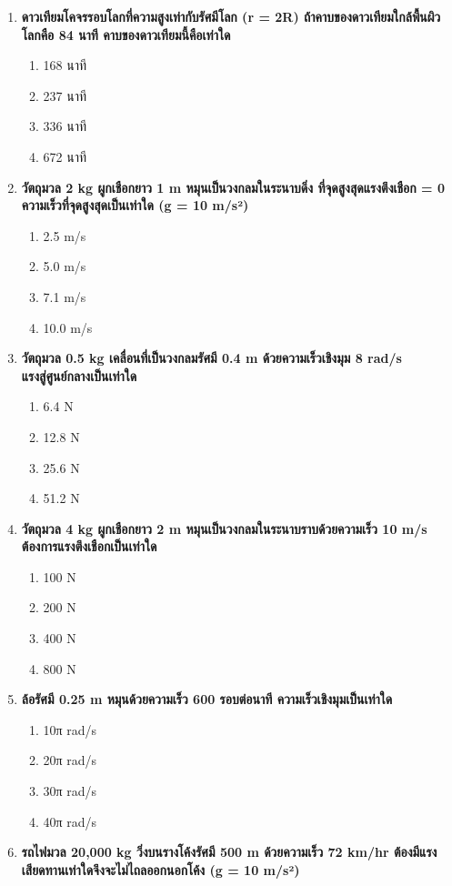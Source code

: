 \documentclass[12pt]{article}
\begin{document}
\begin{enumerate}
\begin{enumerate}[label=\alph*)]
\end{enumerate}
\item \textbf{ดาวเทียมโคจรรอบโลกที่ความสูงเท่ากับรัศมีโลก (r = 2R) ถ้าคาบของดาวเทียมใกล้พื้นผิวโลกคือ 84 นาที คาบของดาวเทียมนี้คือเท่าใด}
\begin{enumerate}[label=\alph*)]
\item 168 นาที
\item 237 นาที
\item 336 นาที
\item 672 นาที
\end{enumerate}
\item \textbf{วัตถุมวล 2 kg ผูกเชือกยาว 1 m หมุนเป็นวงกลมในระนาบดิ่ง ที่จุดสูงสุดแรงตึงเชือก = 0 ความเร็วที่จุดสูงสุดเป็นเท่าใด (g = 10 m/s²)}
\begin{enumerate}[label=\alph*)]
\item 2.5 m/s
\item 5.0 m/s
\item 7.1 m/s
\item 10.0 m/s
\end{enumerate}
\item \textbf{วัตถุมวล 0.5 kg เคลื่อนที่เป็นวงกลมรัศมี 0.4 m ด้วยความเร็วเชิงมุม 8 rad/s แรงสู่ศูนย์กลางเป็นเท่าใด}
\begin{enumerate}[label=\alph*)]
\item 6.4 N
\item 12.8 N
\item 25.6 N
\item 51.2 N
\end{enumerate}
\item \textbf{วัตถุมวล 4 kg ผูกเชือกยาว 2 m หมุนเป็นวงกลมในระนาบราบด้วยความเร็ว 10 m/s ต้องการแรงตึงเชือกเป็นเท่าใด}
\begin{enumerate}[label=\alph*)]
\item 100 N
\item 200 N
\item 400 N
\item 800 N
\end{enumerate}
\item \textbf{ล้อรัศมี 0.25 m หมุนด้วยความเร็ว 600 รอบต่อนาที ความเร็วเชิงมุมเป็นเท่าใด}
\begin{enumerate}[label=\alph*)]
\item 10π rad/s
\item 20π rad/s
\item 30π rad/s
\item 40π rad/s
\end{enumerate}
\item \textbf{รถไฟมวล 20,000 kg วิ่งบนรางโค้งรัศมี 500 m ด้วยความเร็ว 72 km/hr ต้องมีแรงเสียดทานเท่าใดจึงจะไม่ไถลออกนอกโค้ง (g = 10 m/s²)}

\end{enumerate}
\end{document}
